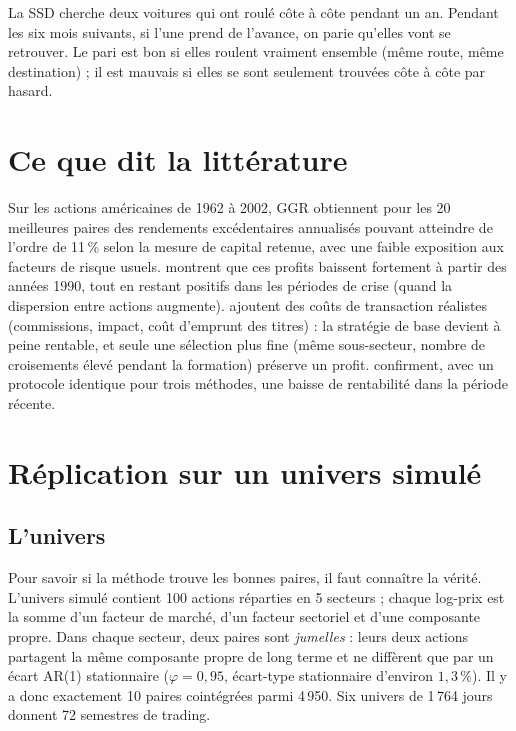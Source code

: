 \begin{intuition}
La SSD cherche deux voitures qui ont roulé côte à côte pendant un an. Pendant les six mois suivants, si l'une prend de l'avance, on parie qu'elles vont se retrouver. Le pari est bon si elles roulent vraiment ensemble (même route, même destination) ; il est mauvais si elles se sont seulement trouvées côte à côte par hasard.
\end{intuition}

\section{Ce que dit la littérature}

Sur les actions américaines de 1962 à 2002, GGR obtiennent pour les 20 meilleures paires des rendements excédentaires annualisés pouvant atteindre de l'ordre de 11\,\% selon la mesure de capital retenue, avec une faible exposition aux facteurs de risque usuels. \citet{dofaff2010} montrent que ces profits baissent fortement à partir des années 1990, tout en restant positifs dans les périodes de crise (quand la dispersion entre actions augmente). \citet{dofaff2012} ajoutent des coûts de transaction réalistes (commissions, impact, coût d'emprunt des titres) : la stratégie de base devient à peine rentable, et seule une sélection plus fine (même sous-secteur, nombre de croisements élevé pendant la formation) préserve un profit. \citet{rad2016} confirment, avec un protocole identique pour trois méthodes, une baisse de rentabilité dans la période récente.

\section{Réplication sur un univers simulé}

\subsection{L'univers}

Pour savoir si la méthode trouve les \og bonnes\fg{} paires, il faut connaître la vérité. L'univers simulé contient 100 actions réparties en 5 secteurs ; chaque log-prix est la somme d'un facteur de marché, d'un facteur sectoriel et d'une composante propre. Dans chaque secteur, deux paires sont \emph{jumelles} : leurs deux actions partagent la même composante propre de long terme et ne diffèrent que par un écart AR(1) stationnaire ($\varphi = 0{,}95$, écart-type stationnaire d'environ $1{,}3\,\%$). Il y a donc exactement 10 paires cointégrées parmi 4\,950. Six univers de 1\,764 jours donnent 72 semestres de trading.

